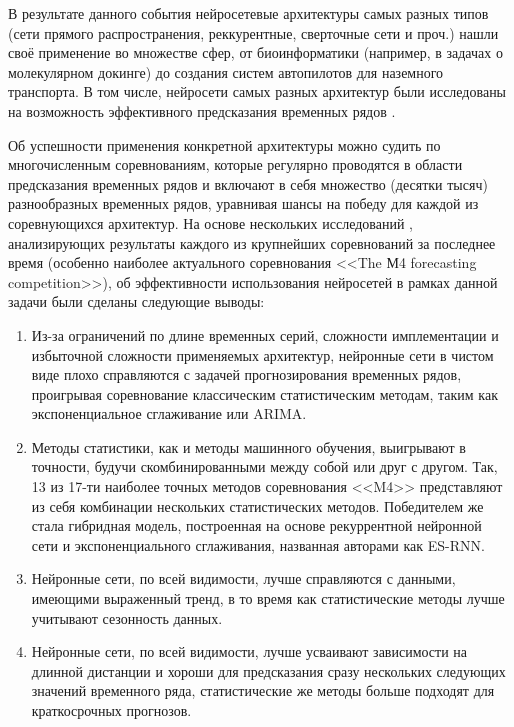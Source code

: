     В результате данного события нейросетевые архитектуры самых разных типов (сети прямого распространения, реккурентные, сверточные сети и проч.) нашли своё применение во множестве сфер, от биоинформатики (например, в задачах о молекулярном докинге) до создания систем автопилотов для наземного транспорта. В том числе, нейросети самых разных архитектур были исследованы на возможность эффективного предсказания временных рядов \cite{CNN_forecasting, ANNs_forecasting_epidemiology, Transformets_forecasting, RNN_forecasting}. 
    
    Об успешности применения конкретной архитектуры можно судить по многочисленным соревнованиям, которые регулярно проводятся в области предсказания временных рядов и включают в себя множество (десятки тысяч) разнообразных временных рядов, уравнивая шансы на победу для каждой из соревнующихся архитектур. На основе нескольких исследований \cite{NN3, NN5, M3, M4}, анализирующих результаты каждого из крупнейших соревнований за последнее время (особенно наиболее актуального соревнования <<The М4 forecasting competition>>), об эффективности использования нейросетей в рамках данной задачи были сделаны следующие выводы:
    \begin{enumerate}
        \item Из-за ограничений по длине временных серий, сложности имплементации и избыточной сложности применяемых архитектур, нейронные сети в чистом виде плохо справляются с задачей прогнозирования временных рядов, проигрывая соревнование классическим статистическим методам, таким как экспоненциальное сглаживание или ARIMA.

        \item Методы статистики, как и методы машинного обучения, выигрывают в точности, будучи скомбинированными между собой или друг с другом. Так, 13 из 17-ти наиболее точных методов соревнования <<M4>> представляют из себя комбинации нескольких статистических методов. Победителем же стала гибридная модель, построенная на основе рекуррентной нейронной сети и экспоненциального сглаживания, названная авторами как ES-RNN.

        \item Нейронные сети, по всей видимости, лучше справляются с данными, имеющими выраженный тренд, в то время как статистические методы лучше учитывают сезонность данных.

        \item Нейронные сети, по всей видимости, лучше усваивают зависимости на длинной дистанции и хороши для предсказания сразу нескольких следующих значений временного ряда, статистические же методы больше подходят для краткосрочных прогнозов.
        
    \end{enumerate}

